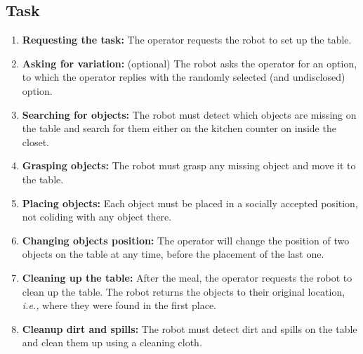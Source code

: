 \subsection{Task}
\label{sattu:task}

\begin{enumerate}
\item \textbf{Requesting the task:} The operator requests the robot to set up the table.
\item\label{sattu:s2} \textbf{Asking for variation:} (optional) The robot asks the operator for an option, to which the operator replies with the randomly selected (and undisclosed) option.
\item \textbf{Searching for objects:} The robot must detect which objects are missing on the table and search for them either on the kitchen counter on inside the closet.
\item \textbf{Grasping objects:} The robot must grasp any missing object and move it to the table.
\item \textbf{Placing objects:} Each object must be placed in a socially accepted position, not coliding with any object there.
\item \textbf{Changing objects position:} The operator will change the position of two objects on the table at any time, before the placement of the last one.
\item \textbf{Cleaning up the table:} After the meal, the operator requests the robot to clean up the table. The robot returns the objects to their original location, \textit{i.e.,} where they were found in the first place.
\item \textbf{Cleanup dirt and spills:} The robot must detect dirt and spills on the table and clean them up using a cleaning cloth.
\end{enumerate}

